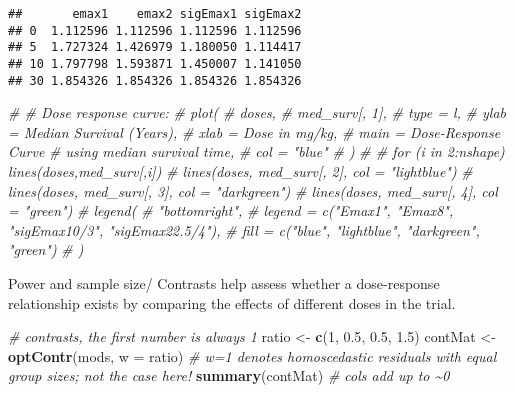 \documentclass[
]{article}
\newenvironment{Shaded}{\begin{snugshade}}{\end{snugshade}}
\newcommand{\AttributeTok}[1]{\textcolor[rgb]{0.13,0.29,0.53}{#1}}
\newcommand{\CommentTok}[1]{\textcolor[rgb]{0.56,0.35,0.01}{\textit{#1}}}
\newcommand{\DecValTok}[1]{\textcolor[rgb]{0.00,0.00,0.81}{#1}}
\newcommand{\FloatTok}[1]{\textcolor[rgb]{0.00,0.00,0.81}{#1}}
\newcommand{\FunctionTok}[1]{\textcolor[rgb]{0.13,0.29,0.53}{\textbf{#1}}}
\newcommand{\NormalTok}[1]{#1}
\newcommand{\OtherTok}[1]{\textcolor[rgb]{0.56,0.35,0.01}{#1}}
\begin{document}
\begin{verbatim}
##       emax1    emax2 sigEmax1 sigEmax2
## 0  1.112596 1.112596 1.112596 1.112596
## 5  1.727324 1.426979 1.180050 1.114417
## 10 1.797798 1.593871 1.450007 1.141050
## 30 1.854326 1.854326 1.854326 1.854326
\end{verbatim}

\begin{Shaded}
\begin{Highlighting}[]
\CommentTok{\# \# Dose response curve:}
\CommentTok{\# plot(}
\CommentTok{\#   doses,}
\CommentTok{\#   med\_surv[, 1],}
\CommentTok{\#   type = \textquotesingle{}l\textquotesingle{},}
\CommentTok{\#   ylab = \textquotesingle{}Median Survival (Years)\textquotesingle{},}
\CommentTok{\#   xlab = \textquotesingle{}Dose in mg/kg\textquotesingle{},}
\CommentTok{\#   main = \textquotesingle{}Dose{-}Response Curve}
\CommentTok{\#      using median survival time\textquotesingle{},}
\CommentTok{\#   col = "blue"}
\CommentTok{\# )}
\CommentTok{\# \# for (i in 2:nshape) lines(doses,med\_surv[,i])}
\CommentTok{\# lines(doses, med\_surv[, 2], col = "lightblue")}
\CommentTok{\# lines(doses, med\_surv[, 3], col = "darkgreen")}
\CommentTok{\# lines(doses, med\_surv[, 4], col = "green")}
\CommentTok{\# legend(}
\CommentTok{\#   "bottomright",}
\CommentTok{\#   legend = c("Emax1", "Emax8", "sigEmax10/3", "sigEmax22.5/4"),}
\CommentTok{\#   fill = c("blue", "lightblue", "darkgreen", "green")}
\CommentTok{\# )}
\end{Highlighting}
\end{Shaded}

Power and sample size/ Contrasts help assess whether a dose-response
relationship exists by comparing the effects of different doses in the
trial.

\begin{Shaded}
\begin{Highlighting}[]
\CommentTok{\# contrasts, the first number is always 1}
\NormalTok{ratio }\OtherTok{\textless{}{-}} \FunctionTok{c}\NormalTok{(}\DecValTok{1}\NormalTok{, }\FloatTok{0.5}\NormalTok{, }\FloatTok{0.5}\NormalTok{, }\FloatTok{1.5}\NormalTok{)}
\NormalTok{contMat }\OtherTok{\textless{}{-}} \FunctionTok{optContr}\NormalTok{(mods, }\AttributeTok{w =}\NormalTok{ ratio) }\CommentTok{\# w=1 denotes homoscedastic residuals with equal group sizes; not the case here!}
\FunctionTok{summary}\NormalTok{(contMat) }\CommentTok{\# cols add up to \textasciitilde{}0 }
\end{Highlighting}
\end{Shaded}
\end{document}
